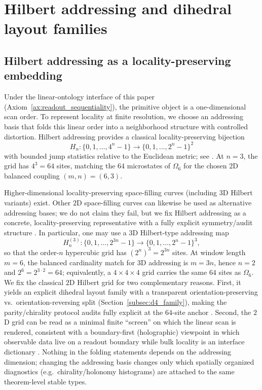 
\section{Hilbert addressing and dihedral layout families}
\label{sec:hilbert_addressing}

\subsection{Hilbert addressing as a locality-preserving embedding}
\label{subsec:hilbert_map}

Under the linear-ontology interface of this paper (Axiom~\ref{ax:readout_sequentiality}), the primitive object is a one-dimensional scan order.
To represent locality at finite resolution, we choose an addressing basis that folds this linear order into a neighborhood structure with controlled distortion.
Hilbert addressing provides a classical locality-preserving bijection
\[
H_n:\{0,1,\dots,4^n-1\}\to \{0,1,\dots,2^n-1\}^2
\]
with bounded jump statistics relative to the Euclidean metric; see \cite{Hilbert1891,Sagan1994,MoonJagadishFaloutsosSaltz2001}.
At $n=3$, the grid has $4^3=64$ sites, matching the $64$ microstates of $\Omega_6$ for the chosen $2$D balanced coupling $(m,n)=(6,3)$.

\begin{remark}\label{rem:why_2d_hilbert}
Higher-dimensional locality-preserving space-filling curves (including $3$D Hilbert variants) exist.
Other $2$D space-filling curves can likewise be used as alternative addressing bases; we do not claim they fail, but we fix Hilbert addressing as a concrete, locality-preserving representative with a fully explicit symmetry/audit structure \cite{Sagan1994}.
In particular, one may use a $3$D Hilbert-type addressing map
\[
H_n^{(3)}:\{0,1,\dots,2^{3n}-1\}\to \{0,1,\dots,2^n-1\}^3,
\]
so that the order-$n$ hypercubic grid has $(2^n)^3=2^{3n}$ sites.
At window length $m=6$, the balanced cardinality match for $3$D addressing is $m=3n$, hence $n=2$ and $2^6=2^{3\cdot 2}=64$; equivalently, a $4\times 4\times 4$ grid carries the same $64$ sites as $\Omega_6$.
We fix the classical $2$D Hilbert grid for two complementary reasons.
First, it yields an explicit dihedral layout family with a transparent orientation-preserving vs.\ orientation-reversing split (Section~\ref{subsec:d4_family}), making the parity/chirality protocol audits fully explicit at the $64$-site anchor \cite{Sagan1994}.
Second, the $2$D grid can be read as a minimal finite ``screen'' on which the linear scan is rendered, consistent with a boundary-first (holographic) viewpoint in which observable data live on a readout boundary while bulk locality is an interface dictionary \cite{tHooft1993,Susskind1995,Bousso2002}.
Nothing in the folding statements depends on the addressing dimension; changing the addressing basis changes only which spatially organized diagnostics (e.g.\ chirality/holonomy histograms) are attached to the same theorem-level stable types.
\end{remark}

